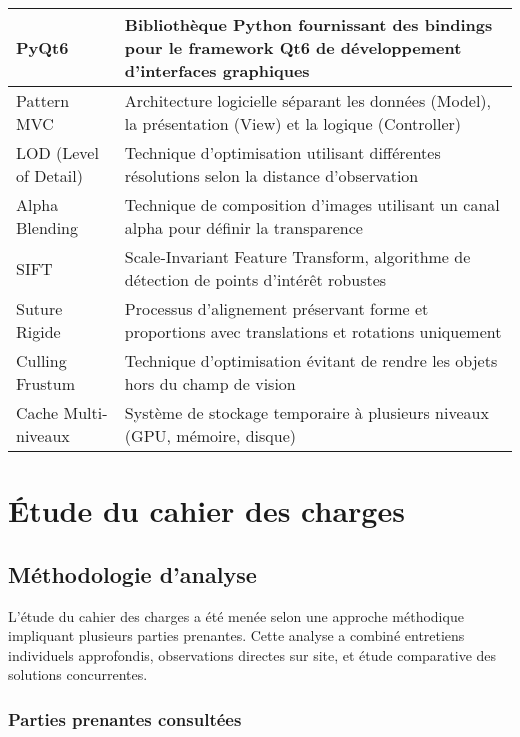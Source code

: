 \documentclass[12pt,a4paper]{report}
\begin{document}
\begin{longtable}{|p{4cm}|p{10cm}|}
PyQt6 & Bibliothèque Python fournissant des bindings pour le framework Qt6 de développement d'interfaces graphiques \\
\hline

Pattern MVC & Architecture logicielle séparant les données (Model), la présentation (View) et la logique (Controller) \\
\hline

LOD (Level of Detail) & Technique d'optimisation utilisant différentes résolutions selon la distance d'observation \\
\hline

Alpha Blending & Technique de composition d'images utilisant un canal alpha pour définir la transparence \\
\hline

SIFT & Scale-Invariant Feature Transform, algorithme de détection de points d'intérêt robustes \\
\hline

Suture Rigide & Processus d'alignement préservant forme et proportions avec translations et rotations uniquement \\
\hline

Culling Frustum & Technique d'optimisation évitant de rendre les objets hors du champ de vision \\
\hline

Cache Multi-niveaux & Système de stockage temporaire à plusieurs niveaux (GPU, mémoire, disque) \\
\hline

\end{longtable}

\section{Étude du cahier des charges}

\subsection{Méthodologie d'analyse}

L'étude du cahier des charges a été menée selon une approche méthodique impliquant plusieurs parties prenantes. Cette analyse a combiné entretiens individuels approfondis, observations directes sur site, et étude comparative des solutions concurrentes.

\subsubsection{Parties prenantes consultées}
\end{document}

